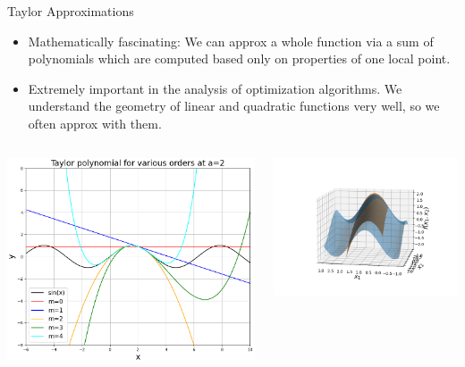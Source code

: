 \begin{vbframe}{Taylor Approximations}

\begin{itemize}

\item Mathematically fascinating:
We can approx a whole function via a sum of polynomials which are computed based only on properties of one local point. 

\item Extremely important in the analysis of optimization algorithms. We understand the geometry of linear and quadratic functions very well, so we often approx with them.
\end{itemize}

\begin{columns}
\begin{column}{0.45\textwidth}
\includegraphics[width=\columnwidth]{figure_man/taylor_univariate.png}
\end{column}
\begin{column}{0.55\textwidth}
\includegraphics[width=\columnwidth]{figure_man/Taylor2D/Taylor2D_2nd-100.png}
\end{column}
\end{columns}


\end{vbframe}


